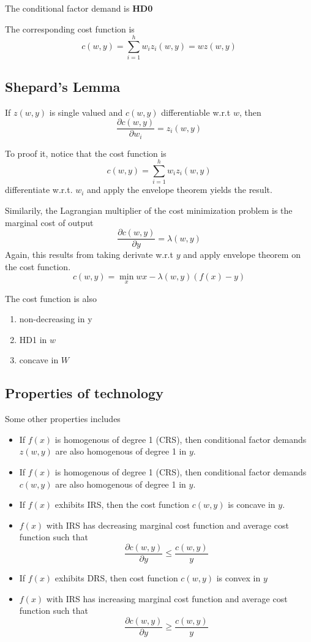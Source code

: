 \documentclass[twocolumn, fleqn]{article}
\begin{document}
		The conditional factor demand is \textbf{HD0}
		
		The corresponding cost function is 
		\[c(w,y) = \sum_{i=1}^{h} w_i z_i (w,y) = w z(w,y)\]
		
		\subsection{Shepard's Lemma}
		If $z(w,y)$ is single valued and $c(w,y)$ differentiable w.r.t $w$, then 
		\[\frac{\partial c(w,y)}{\partial w_i} = z_i (w,y)\]
		
		To proof it, notice that the cost function is 
		\[c(w,y) = \sum_{i=1}^{h} w_i z_i (w,y) \]
		differentiate w.r.t. $w_i$ and apply the envelope theorem yields the result.
		
		Similarily, the Lagrangian multiplier of the cost minimization problem is the marginal cost of output
		\[\frac{\partial c(w,y)}{\partial y} = \lambda(w,y)\]
		Again, this results from taking derivate w.r.t $y$ and apply envelope theorem on the cost function.
		\[c(w,y) = \min_x wx - \lambda(w,y)(f(x)-y)\]
		
		The cost function is also 
		\begin{enumerate}
			\item non-decreasing in y
			\item HD1 in $w$
			\item concave in $W$
		\end{enumerate}
		
		\subsection{Properties of technology}
		Some other properties includes
		\begin{itemize}
			\item If $f(x)$ is homogenous of degree 1 (CRS), then conditional factor demands $z(w,y)$ are also homogenous of degree 1 in $y$.
			\item If $f(x)$ is homogenous of degree 1 (CRS), then conditional factor demands $c(w,y)$ are also homogenous of degree 1 in $y$.
			\item If $f(x)$ exhibits IRS, then the cost function $c(w,y)$ is concave in $y$.
			\item $f(x)$ with IRS has decreasing marginal cost function and average cost function such that \[\frac{\partial c(w,y)}{\partial y}\leq \frac{c(w,y)}{y}\]
			\item If $f(x)$ exhibits DRS, then cost function $c(w,y)$ is convex in $y$
			\item $f(x)$ with IRS has increasing marginal cost function and average cost function such that \[\frac{\partial c(w,y)}{\partial y}\geq \frac{c(w,y)}{y}\]
		\end{itemize}
		
\end{document}
